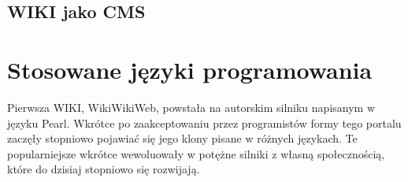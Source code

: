 \documentclass{article}
\begin{document}
	\subsection{WIKI jako CMS}


			
	

\section{Stosowane języki programowania}
Pierwsza WIKI, WikiWikiWeb, powstała na autorskim silniku napisanym w języku Pearl. Wkrótce po zaakceptowaniu przez programistów formy tego portalu zaczęły stopniowo pojawiać się jego klony pisane w różnych językach. Te popularniejsze wkrótce wewoluowały w potężne silniki z własną społecznością, które do dzisiaj stopniowo się rozwijają. 
\end{document}
